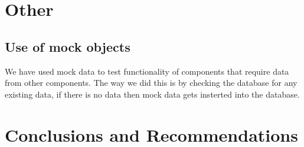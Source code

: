\documentclass[11pt,fleqn]{book} %
\begin{document}





\chapter{Other}
	\section{Use of mock objects}
	We have used mock data to test functionality of components that require data from other components. The way we did this is by checking the database for any existing data, if there is no data then mock data gets insterted into the database.


\chapter{Conclusions and Recommendations}
\end{document}
